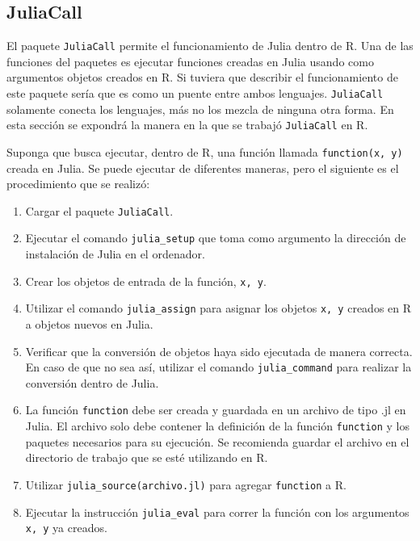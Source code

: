 \subsection{JuliaCall}
El paquete \texttt{JuliaCall} permite el funcionamiento de \textsf{Julia} dentro de \textsf{R}. Una de las funciones del paquetes es ejecutar funciones creadas en \textsf{Julia} usando como argumentos objetos creados en \textsf{R}. Si tuviera que describir el funcionamiento de este paquete sería que es como un puente entre ambos lenguajes. \texttt{JuliaCall} solamente conecta los lenguajes, más no los mezcla de ninguna otra forma. En esta sección se expondrá la manera en la que se trabajó \texttt{JuliaCall} en \textsf{R}. 

Suponga que busca ejecutar, dentro de \textsf{R}, una función llamada \texttt{function(x, y)} creada en \textsf{Julia}. Se puede ejecutar de diferentes maneras, pero el siguiente es el procedimiento que se realizó:

\begin{enumerate}
	\item Cargar el paquete \texttt{JuliaCall}. 
	
	\item Ejecutar el comando \texttt{julia\_setup} que toma como argumento la dirección de instalación de \textsf{Julia} en el ordenador. 
	
	\item Crear los objetos de entrada de la función, \texttt{x, y}. 
	
	\item Utilizar el comando \texttt{julia\_assign} para asignar los objetos \texttt{x, y} creados en \textsf{R} a objetos nuevos en \textsf{Julia}. 
	
	\item Verificar que la conversión de objetos haya sido ejecutada de manera correcta. En caso de que no sea así, utilizar el comando \texttt{julia\_command} para realizar la conversión dentro de \textsf{Julia}. 
	
	\item La función \texttt{function} debe ser creada y guardada en un archivo de tipo \textsf{.jl} en \textsf{Julia}. El archivo solo debe contener la definición de la función \texttt{function} y los paquetes necesarios para su ejecución. Se recomienda guardar el archivo en el directorio de trabajo que se esté utilizando en \textsf{R}. 
	
	\item Utilizar \texttt{julia\_source(archivo.jl)} para agregar \texttt{function} a \textsf{R}. 
	
	\item Ejecutar la instrucción \texttt{julia\_eval} para correr la función con los argumentos \texttt{x, y} ya creados. 
	 
\end{enumerate}

